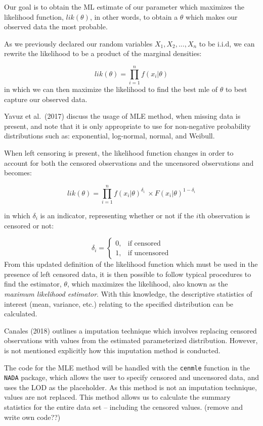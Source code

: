 \documentclass[12pt, twoside]{amherstthesis}
\begin{document}
Our goal is to obtain the ML estimate of our parameter which maximizes the likelihood function, \(lik(\theta)\), in other words, to obtain a \(\theta\) which makes our observed data the most probable.

As we previously declared our random variables \(X_1, X_2,...,X_n\) to be i.i.d, we can rewrite the likelihood to be a product of the marginal densities:

\[lik(\theta) = \prod_{i=1}^{n} f(x_i|\theta)\]
in which we can then maximize the likelihood to find the best mle of \(\theta\) to best capture our observed data.

Yavuz et al.~(2017) discuss the usage of MLE method, when missing data is present, and note that it is only appropriate to use for non-negative probability distributions such as: exponential, log-normal, normal, and Weibull.

When left censoring is present, the likelihood function changes in order to account for both the censored observations and the uncensored observations and becomes:

\[lik(\theta) = \prod_{i=1}^n f(x_i|\theta)^{\delta_{i}} \ \times F(x_i|\theta)^{1-{\delta_{i}}}\]

in which \(\delta_{i}\) is an indicator, representing whether or not if the \(i\)th observation is censored or not:

\[\delta_i =
\begin{cases}
  0, & \text{if censored} \\
  1, & \text{if uncensored}
\end{cases}\]
From this updated definition of the likelihood function which must be used in the presence of left censored data, it is then possible to follow typical procedures to find the estimator, \(\theta\), which maximizes the likelihood, also known as the \emph{maximum likelihood estimator}. With this knowledge, the descriptive statistics of interest (mean, variance, etc.) relating to the specified distribution can be calculated.

Canales (2018) outlines a imputation technique which involves replacing censored observations with values from the estimated parameterized distribution. However, is not mentioned explicitly how this imputation method is conducted.

The code for the MLE method will be handled with the \texttt{cenmle} function in the \texttt{NADA} package, which allows the user to specify censored and uncensored data, and uses the LOD as the placeholder. As this method is not an imputation technique, values are not replaced. This method allows us to calculate the summary statistics for the entire data set -- including the censored values. (remove and write own code??)
\end{document}
